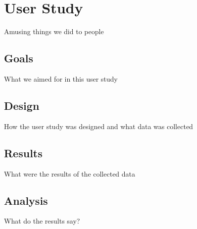\chapter{User Study}

Amusing things we did to people

\section{Goals}

What we aimed for in this user study

\section{Design}

How the user study was designed and what data was collected

\section{Results}

What were the results of the collected data

\section{Analysis}

What do the results say?